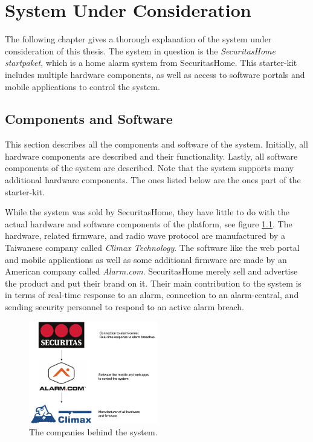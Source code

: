 \chapter{System Under Consideration} \label{ch:system}
The following chapter gives a thorough explanation of the system under consideration of this thesis. The system in question is the \textit{SecuritasHome startpaket}, which is a home alarm system from SecuritasHome. This starter-kit includes multiple hardware components, as well as access to software portals and mobile applications to control the system.

\section{Components and Software} \label{ch:system:components}
This section describes all the components and software of the system. Initially, all hardware components are described and their functionality. Lastly, all software components of the system are described. Note that the system supports many additional hardware components. The ones listed below are the ones part of the starter-kit.

While the system was sold by SecuritasHome, they have little to do with the actual hardware and software components of the platform, see figure \ref{fig:company-structure}. The hardware, related firmware, and radio wave protocol are manufactured by a Taiwanese company called \textit{Climax Technology}. The software like the web portal and mobile applications as well as some additional firmware are made by an American company called \textit{Alarm.com}. SecuritasHome merely sell and advertise the product and put their brand on it. Their main contribution to the system is in terms of real-time response to an alarm, connection to an alarm-central, and sending security personnel to respond to an active alarm breach.
\begin{figure}[!ht]
  \begin{center}
    \includegraphics[width=0.5\textwidth]{images/company-structure.png}
  \end{center}
  \caption{The companies behind the system.}
  \label{fig:company-structure}
\end{figure}

